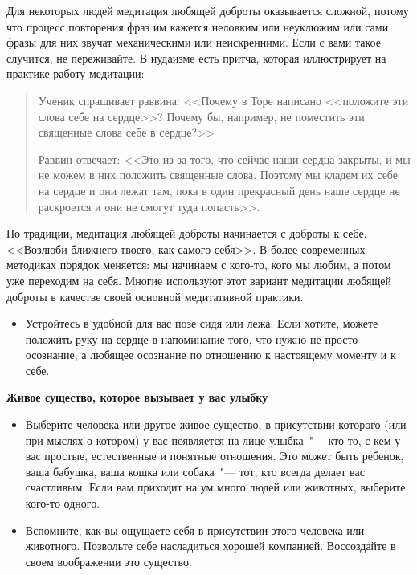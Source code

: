 Для некоторых людей медитация любящей доброты оказывается сложной, потому что процесс повторения фраз им кажется неловким или неуклюжим или сами фразы для них звучат механическими или неискренними. Если с вами такое случится, не переживайте. В иудаизме есть притча, которая иллюстрирует на практике работу медитации:

\begin{quotation}
	Ученик спрашивает раввина: <<Почему в Торе написано <<положите эти слова себе на сердце>>? Почему бы, например, не поместить эти священные слова себе в сердце?>>

	Раввин отвечает: <<Это из-за того, что сейчас наши сердца закрыты, и мы не можем в них положить священные слова. Поэтому мы кладем их себе на сердце и они лежат там, пока в один прекрасный день наше сердце не раскроется и они не смогут туда попасть>>.\cite{71}
\end{quotation}

\newpage
{} \label{M:Loving-Kindness_for_a_Loved_One}
По традиции, медитация любящей доброты начинается с доброты к себе. <<Возлюби ближнего твоего, как самого себя>>. В более современных методиках порядок меняется: мы начинаем с кого-то, кого мы любим, а потом уже переходим на себя. Многие используют этот вариант медитации любящей доброты в качестве своей основной медитативной практики.

\begin{itemize}
	\item Устройтесь в удобной для вас позе сидя или лежа. Если хотите, можете положить руку на сердце в напоминание того, что нужно не просто осознание, а любящее осознание по отношению к настоящему моменту и к себе. 
\end{itemize}

\vspace{3ex}

{\large \textbf{Живое существо, которое вызывает у вас улыбку}}
\begin{itemize}
	\item Выберите человека или другое живое существо, в присутствии которого (или при мыслях о котором) у вас появляется на лице улыбка~"--- кто-то, с кем у вас простые, естественные и понятные отношения. Это может быть ребенок, ваша бабушка, ваша кошка или собака~"--- тот, кто всегда делает вас счастливым. Если вам приходит на ум много людей или животных, выберите кого-то одного.
	
	\item Вспомните, как вы ощущаете себя в присутствии этого человека или животного. Позвольте себе насладиться хорошей компанией. Воссоздайте в своем воображении это существо.
\end{itemize}

